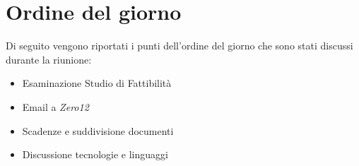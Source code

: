 \clearpage
\section{Ordine del giorno}
Di seguito vengono riportati i punti dell’ordine del giorno che sono stati discussi durante la riunione:
\begin{itemize}
	\item Esaminazione Studio di Fattibilità 
	\item Email a \emph{Zero12}
	\item Scadenze e suddivisione documenti
	\item Discussione tecnologie e linguaggi
\end{itemize}